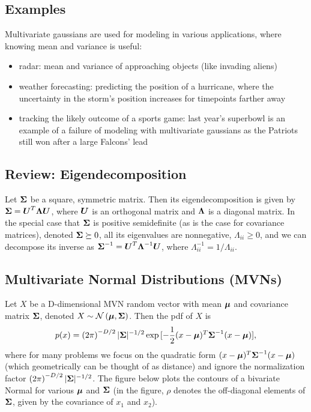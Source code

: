 \documentclass{article}
\begin{document}

\subsection{Examples}
Multivariate gaussians are used for modeling in various applications, where knowing mean and variance is useful:
\begin{itemize}
\item{radar: mean and variance of approaching objects (like invading aliens)}
\item{weather forecasting: predicting the position of a hurricane, where the uncertainty in the storm's position increases for timepoints farther away}
\item{tracking the likely outcome of a sports game: last year's superbowl is an example of a failure of modeling with multivariate gaussians as the Patriots still won after a large Falcons' lead}
\end{itemize}

\subsection{Review: Eigendecomposition} 

Let $\boldsymbol{\Sigma}$ be a square, symmetric matrix. Then its eigendecomposition is given by $\boldsymbol{\Sigma} = \boldsymbol{U}^T \boldsymbol{\Lambda} \boldsymbol{U}$, where $\boldsymbol{U}$ is an orthogonal matrix and $\boldsymbol{\Lambda}$ is a diagonal matrix. In the special case that $\boldsymbol{\Sigma}$ is positive semidefinite (as is the case for covariance matrices), denoted $\boldsymbol{\Sigma} \succeq 0$, all its eigenvalues are nonnegative, $\Lambda_{ii} \geq 0$, and we can decompose its inverse as $\boldsymbol{\Sigma}^{-1} = \boldsymbol{U}^T \boldsymbol{\Lambda}^{-1}\boldsymbol{U}$, where $\Lambda_{ii}^{-1} = 1/\Lambda_{ii}$.

\subsection{Multivariate Normal Distributions (MVNs)}
Let $X$ be a D-dimensional MVN random vector with mean $\boldsymbol{\mu}$ and covariance matrix $\boldsymbol{\Sigma}$, denoted $X \sim \mathcal{N}\left(\boldsymbol{\mu},\boldsymbol{\Sigma}\right)$. Then the pdf of $X$ is
$$ p(x) = \left(2\pi\right)^{-D/2} |\boldsymbol{\Sigma}|^{-1/2} \exp{[-\frac{1}{2}(x-\boldsymbol{\mu})^T\boldsymbol{\Sigma}^{-1}(x-\boldsymbol{\mu})]}, $$
where for many problems we focus on the quadratic form $(x-\boldsymbol{\mu})^T\boldsymbol{\Sigma}^{-1}(x-\boldsymbol{\mu})$ (which geometrically can be thought of as distance) and ignore the normalization factor $\left(2\pi\right)^{-D/2} |\boldsymbol{\Sigma}|^{-1/2}$. The figure below plots the contours of a bivariate Normal for various $\boldsymbol{\mu}$ and $\boldsymbol{\Sigma}$ (in the figure, $\rho$ denotes the off-diagonal elements of $\boldsymbol{\Sigma}$, given by the covariance of $x_1$ and $x_2$).
\end{document}
